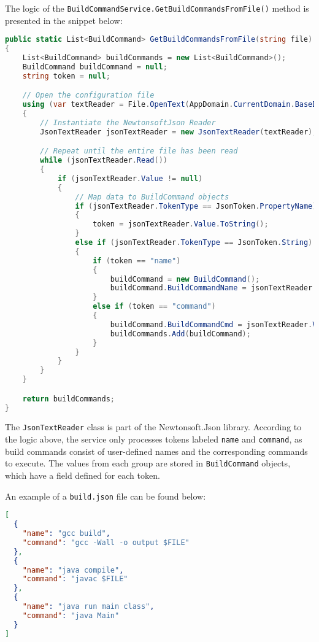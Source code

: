 The logic of the \texttt{BuildCommandService.GetBuildCommandsFromFile()} method is presented in the snippet below:

\begin{lstlisting}[language=csharp, caption={Reading build commands saved in the configuration file through the BuildCommandService}]
public static List<BuildCommand> GetBuildCommandsFromFile(string file)
{
    List<BuildCommand> buildCommands = new List<BuildCommand>();
    BuildCommand buildCommand = null;
    string token = null;

    // Open the configuration file
    using (var textReader = File.OpenText(AppDomain.CurrentDomain.BaseDirectory + file))
    {
        // Instantiate the NewtonsoftJson Reader
        JsonTextReader jsonTextReader = new JsonTextReader(textReader);

        // Repeat until the entire file has been read
        while (jsonTextReader.Read())
        {
            if (jsonTextReader.Value != null)
            {
                // Map data to BuildCommand objects
                if (jsonTextReader.TokenType == JsonToken.PropertyName)
                {
                    token = jsonTextReader.Value.ToString();
                }
                else if (jsonTextReader.TokenType == JsonToken.String)
                {
                    if (token == "name")
                    {
                        buildCommand = new BuildCommand();
                        buildCommand.BuildCommandName = jsonTextReader.Value.ToString();
                    }
                    else if (token == "command")
                    {
                        buildCommand.BuildCommandCmd = jsonTextReader.Value.ToString();
                        buildCommands.Add(buildCommand);
                    }
                }
            }
        }
    }

    return buildCommands;
}
\end{lstlisting}

The \texttt{JsonTextReader} class is part of the Newtonsoft.Json library. According to the logic above, the service only processes tokens labeled \texttt{name} and \texttt{command}, as build commands consist of user-defined names and the corresponding commands to execute. The values from each group are stored in \texttt{BuildCommand} objects, which have a field defined for each token.

An example of a \texttt{build.json} file can be found below:

\begin{lstlisting}[language=json, caption={Structure of the JSON-formatted build commands file in Pie}]
[
  {
    "name": "gcc build",
    "command": "gcc -Wall -o output $FILE"
  },
  {
    "name": "java compile",
    "command": "javac $FILE"
  },
  {
    "name": "java run main class",
    "command": "java Main"
  }
]
\end{lstlisting}

